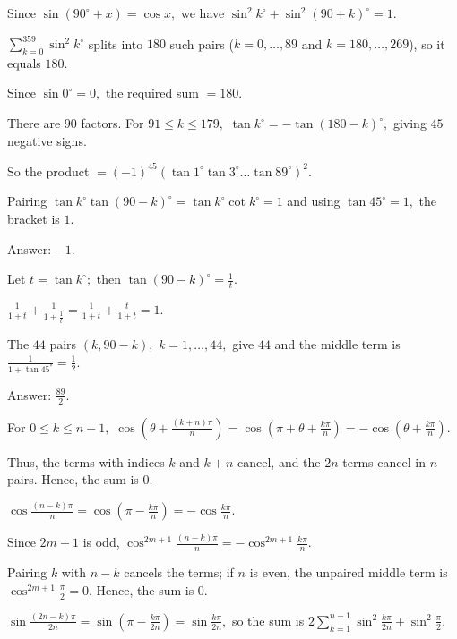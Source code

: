 \item Since $\sin(90^\circ + x) = \cos x,$ we have $\sin^2k^\circ + \sin^2(90 + k)^\circ = 1.$

  $\sum_{k = 0}^{359}\sin^2k^\circ$ splits into $180$ such pairs ($k = 0, \ldots, 89$ and $k = 180, \ldots, 269$), so it equals
  $180.$

  Since $\sin 0^\circ = 0,$ the required sum $= 180.$

\item There are $90$ factors. For $91 \leq k \leq 179,$ $\tan k^\circ = -\tan(180 - k)^\circ,$ giving $45$ negative signs.

  So the product $= (-1)^{45}\left(\tan 1^\circ\tan 3^\circ \ldots \tan 89^\circ\right)^2.$

  Pairing $\tan k^\circ\tan(90 - k)^\circ = \tan k^\circ\cot k^\circ = 1$ and using $\tan 45^\circ = 1,$ the bracket is $1.$

  Answer: $-1.$

\item Let $t = \tan k^\circ;$ then $\tan(90 - k)^\circ = \frac{1}{t}.$

  $\frac{1}{1 + t} + \frac{1}{1 + \frac{1}{t}} = \frac{1}{1 + t} + \frac{t}{1 + t} = 1.$

  The $44$ pairs $(k, 90 - k),$ $k = 1, \ldots, 44,$ give $44$ and the middle term is $\frac{1}{1 + \tan 45^\circ} =
  \frac{1}{2}.$

  Answer: $\frac{89}{2}.$

\item For $0 \leq k \leq n - 1,$ $\cos\left(\theta + \frac{(k + n)\pi}{n}\right) = \cos\left(\pi + \theta +
  \frac{k\pi}{n}\right) = -\cos\left(\theta + \frac{k\pi}{n}\right).$

  Thus, the terms with indices $k$ and $k + n$ cancel, and the $2n$ terms cancel in $n$ pairs. Hence, the sum is $0.$

\item $\cos\frac{(n - k)\pi}{n} = \cos\left(\pi - \frac{k\pi}{n}\right) = -\cos\frac{k\pi}{n}.$

  Since $2m + 1$ is odd, $\cos^{2m + 1}\frac{(n - k)\pi}{n} = -\cos^{2m + 1}\frac{k\pi}{n}.$

  Pairing $k$ with $n - k$ cancels the terms; if $n$ is even, the unpaired middle term is $\cos^{2m + 1}\frac{\pi}{2} = 0.$
  Hence, the sum is $0.$

\item $\sin\frac{(2n - k)\pi}{2n} = \sin\left(\pi - \frac{k\pi}{2n}\right) = \sin\frac{k\pi}{2n},$ so the sum is $2\sum_{k =
    1}^{n - 1}\sin^2\frac{k\pi}{2n} + \sin^2\frac{\pi}{2}.$

